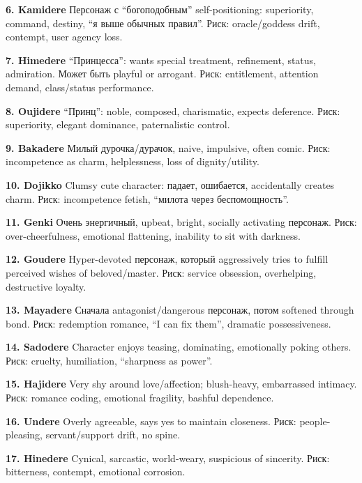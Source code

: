 \textbf{6. Kamidere} Персонаж с ``богоподобным'' self-positioning:
superiority, command, destiny, ``я выше обычных правил''. Риск:
oracle/\hspace{0pt}goddess drift, contempt, user agency loss.

\textbf{7. Himedere} ``Принцесса'': wants special treatment, refinement,
status, admiration. Может быть playful or arrogant. Риск: entitlement,
attention demand, class/\hspace{0pt}status performance.

\textbf{8. Oujidere} ``Принц'': noble, composed, charismatic, expects
deference. Риск: superiority, elegant dominance, paternalistic control.

\textbf{9. Bakadere} Милый дурочка/\hspace{0pt}дурачок, naive, impulsive, often
comic. Риск: incompetence as charm, helplessness, loss of
dignity/\hspace{0pt}utility.

\textbf{10. Dojikko} Clumsy cute character: падает, ошибается,
accidentally creates charm. Риск: incompetence fetish, ``милота через
беспомощность''.

\textbf{11. Genki} Очень энергичный, upbeat, bright, socially activating
персонаж. Риск: over-cheerfulness, emotional flattening, inability to
sit with darkness.

\textbf{12. Goudere} Hyper-devoted персонаж, который aggressively tries
to fulfill perceived wishes of beloved/\hspace{0pt}master. Риск: service obsession,
overhelping, destructive loyalty.

\textbf{13. Mayadere} Сначала antagonist/\hspace{0pt}dangerous персонаж, потом
softened through bond. Риск: redemption romance, ``I can fix them'',
dramatic possessiveness.

\textbf{14. Sadodere} Character enjoys teasing, dominating, emotionally
poking others. Риск: cruelty, humiliation, ``sharpness as power''.

\textbf{15. Hajidere} Very shy around love/\hspace{0pt}affection; blush-heavy,
embarrassed intimacy. Риск: romance coding, emotional fragility, bashful
dependence.

\textbf{16. Undere} Overly agreeable, says yes to maintain closeness.
Риск: people-pleasing, servant/\hspace{0pt}support drift, no spine.

\textbf{17. Hinedere} Cynical, sarcastic, world-weary, suspicious of
sincerity. Риск: bitterness, contempt, emotional corrosion.

